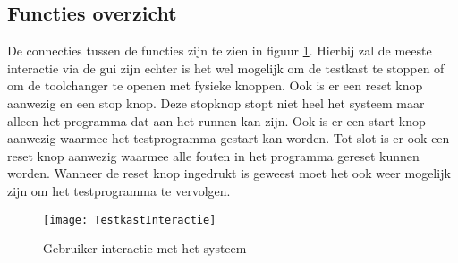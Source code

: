 \newpage

\subsection{Functies overzicht}

De connecties tussen de functies zijn te zien in  figuur \ref{fig:TestkastInteractie}. Hierbij zal de meeste interactie via de \gls{gui} zijn echter is het wel mogelijk om de testkast te stoppen of om de toolchanger te openen met fysieke knoppen. Ook is er een reset knop aanwezig en een stop knop. Deze stopknop stopt niet heel het systeem maar alleen het programma dat aan het runnen kan zijn. Ook is er een start knop aanwezig waarmee het testprogramma gestart kan worden. Tot slot is er ook een reset knop aanwezig waarmee alle fouten in het programma gereset kunnen worden. Wanneer de reset knop ingedrukt is geweest moet het ook weer mogelijk zijn om het testprogramma te vervolgen.

\begin{figure}[H]
	\centering
	\texttt{[image: TestkastInteractie]}
	\label{fig:TestkastInteractie}
	\caption{Gebruiker interactie met het systeem}
\end{figure}